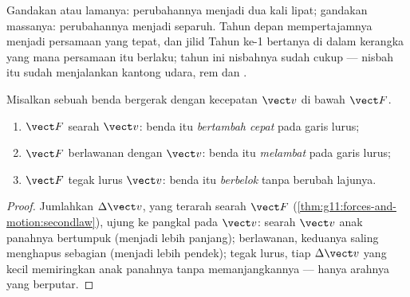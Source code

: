 \begin{remark}
Gandakan  atau lamanya: perubahannya menjadi dua kali lipat;
gandakan massanya: perubahannya menjadi separuh. Tahun depan
mempertajamnya menjadi persamaan yang tepat, dan jilid Tahun ke-1
bertanya di dalam kerangka yang mana persamaan itu berlaku; tahun ini
nisbahnya sudah cukup --- nisbah itu sudah menjalankan kantong udara,
rem dan .
\end{remark}

\begin{proposition}\label{prop:g11:forces-and-motion:cases}
Misalkan sebuah benda bergerak dengan kecepatan $\vect v$ di bawah  $\vect F$.
\begin{enumerate}
  \item $\vect F$ searah $\vect v$: benda itu \emph{bertambah cepat}
        pada garis lurus;
  \item $\vect F$ berlawanan dengan $\vect v$: benda itu
        \emph{melambat} pada garis lurus;
  \item $\vect F$ tegak lurus $\vect v$: benda itu \emph{berbelok}
        tanpa berubah lajunya.
\end{enumerate}
\end{proposition}

\begin{proof}
Jumlahkan $\Delta\vect v$, yang terarah searah $\vect F$
(\cref{thm:g11:forces-and-motion:secondlaw}), ujung ke pangkal pada
$\vect v$: searah $\vect v$ anak panahnya bertumpuk (menjadi lebih
panjang); berlawanan, keduanya saling menghapus sebagian (menjadi lebih
pendek); tegak lurus, tiap $\Delta \vect v$ yang kecil memiringkan anak
panahnya tanpa memanjangkannya --- hanya arahnya yang berputar.
\end{proof}

